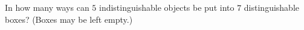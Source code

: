 In how many ways can $5$ indistinguishable objects be put into $7$ distinguishable boxes? (Boxes may be left empty.)
